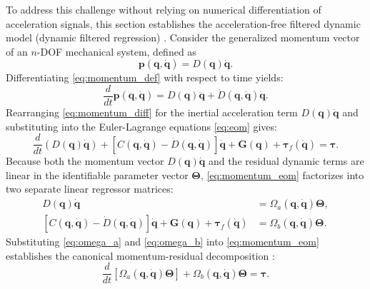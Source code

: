 \documentclass[lettersize,journal]{IEEEtran}
\begin{document}
To address this challenge without relying on numerical differentiation of acceleration signals, this section establishes the acceleration-free filtered dynamic model (dynamic filtered regression) \cite{GarciaAlarcon2012, AguilarSierra2014, Reyes1997}. Consider the generalized momentum vector of an $n$-DOF mechanical system, defined as
\begin{equation}
	\bm{p}(\bm{q}, \dot{\bm{q}}) = D(\bm{q})\dot{\bm{q}}.
	\label{eq:momentum_def}
\end{equation}
Differentiating \eqref{eq:momentum_def} with respect to time yields:
\begin{equation}
	\frac{d}{dt} \bm{p}(\bm{q}, \dot{\bm{q}}) = D(\bm{q})\ddot{\bm{q}} + \dot{D}(\bm{q}, \dot{\bm{q}})\dot{\bm{q}}.
	\label{eq:momentum_diff}
\end{equation}
Rearranging \eqref{eq:momentum_diff} for the inertial acceleration term $D(\bm{q})\ddot{\bm{q}}$ and substituting into the Euler-Lagrange equations \eqref{eq:eom} gives:
\begin{equation}
	\frac{d}{dt}\left(D(\bm{q})\dot{\bm{q}}\right) + \left[C(\bm{q}, \dot{\bm{q}}) - \dot{D}(\bm{q}, \dot{\bm{q}})\right]\dot{\bm{q}} + \bm{G}(\bm{q}) + \bm{\tau}_f(\dot{\bm{q}}) = \bm{\tau}.
	\label{eq:momentum_eom}
\end{equation}
Because both the momentum vector $D(\bm{q})\dot{\bm{q}}$ and the residual dynamic terms are linear in the identifiable parameter vector $\bm{\Theta}$, \eqref{eq:momentum_eom} factorizes into two separate linear regressor matrices:
\begin{align}
	D(\bm{q})\dot{\bm{q}} &= \Omega_a(\bm{q}, \dot{\bm{q}}) \bm{\Theta}, \label{eq:omega_a} \\
	\left[C(\bm{q}, \dot{\bm{q}}) - \dot{D}(\bm{q}, \dot{\bm{q}})\right]\dot{\bm{q}} + \bm{G}(\bm{q}) + \bm{\tau}_f(\dot{\bm{q}}) &= \Omega_b(\bm{q}, \dot{\bm{q}}) \bm{\Theta}. \label{eq:omega_b}
\end{align}
Substituting \eqref{eq:omega_a} and \eqref{eq:omega_b} into \eqref{eq:momentum_eom} establishes the canonical momentum-residual decomposition \cite{GarciaAlarcon2012, AguilarSierra2014}:
\begin{equation}
	\frac{d}{dt}\left[\Omega_a(\bm{q}, \dot{\bm{q}})\bm{\Theta}\right] + \Omega_b(\bm{q}, \dot{\bm{q}})\bm{\Theta} = \bm{\tau}.
	\label{eq:filtered_decomp}
\end{equation}
\end{document}
